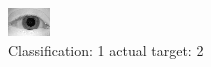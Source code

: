 \begin{figure}[h!]
\begin{center}
\includegraphics[width=0.60\columnwidth]{figures/ID1004_class_1_target_2.png}
\end{center}
\caption{ Classification: 1 actual target: 2}
\label{fig:ID1004_class_1_target_2}
\end{figure}
